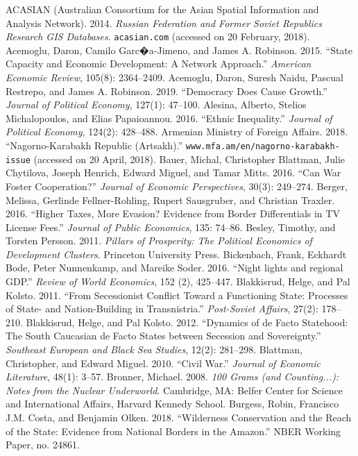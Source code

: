 \documentclass[12pt,a4paper]{article}%
\begin{document}
\begin{thebibliography}{99}
\bibitem{} ACASIAN (Australian Consortium for the Asian Spatial Information and Analysis Network). 2014. \textit{Russian Federation and Former Soviet Republics Research GIS Databases}. \verb!acasian.com! (accessed on 20 February, 2018).
\bibitem{} Acemoglu, Daron, Camilo Garc�a-Jimeno, and James A. Robinson. 2015. ``State Capacity and Economic Development: A Network Approach.'' \textit{American Economic Review}, 105(8): 2364--2409.
\bibitem{} Acemoglu, Daron, Suresh Naidu, Pascual Restrepo, and James A. Robinson. 2019. ``Democracy Does Cause Growth.'' \textit{Journal of Political Economy}, 127(1): 47--100.
\bibitem{} Alesina, Alberto, Stelios Michalopoulos, and Elias Papaioannou. 2016. ``Ethnic Inequality.'' \textit{Journal of Political Economy}, 124(2): 428--488.
\bibitem{} Armenian Ministry of Foreign Affairs. 2018. ``Nagorno-Karabakh Republic (Artsakh).'' \verb!www.mfa.am/en/nagorno-karabakh-issue! (accessed on 20 April, 2018).
\bibitem{} Bauer, Michal, Christopher Blattman, Julie Chytilova, Joseph Henrich, Edward Miguel, and Tamar Mitts. 2016. ``Can War Foster Cooperation?'' \textit{Journal of Economic Perspectives}, 30(3): 249--274.
\bibitem{} Berger, Melissa, Gerlinde Fellner-Rohling, Rupert Sausgruber, and Christian Traxler. 2016. ``Higher Taxes, More Evasion? Evidence from Border Differentials in TV License Fees.'' \textit{Journal of Public Economics}, 135: 74--86.
\bibitem{} Besley, Timothy, and Torsten Persson. 2011. \textit{Pillars of Prosperity: The Political Economics of Development Clusters}. Princeton University Press.
\bibitem{} Bickenbach, Frank, Eckhardt Bode, Peter Nunnenkamp, and Mareike Soder. 2016. ``Night lights and regional GDP.'' \textit{Review of World Economics}, 152 (2), 425--447.
\bibitem{} Blakkisrud, Helge, and Pal Kolsto. 2011. ``From Secessionist Conflict Toward a Functioning State: Processes of State- and Nation-Building in Transnistria.'' \textit{Post-Soviet Affairs}, 27(2): 178--210.
\bibitem{} Blakkisrud, Helge, and Pal Kolsto. 2012. ``Dynamics of de Facto Statehood: The South Caucasian de Facto States between Secession and Sovereignty.'' \textit{Southeast European and Black Sea Studies}, 12(2): 281--298.
\bibitem{} Blattman, Christopher, and Edward Miguel. 2010. ``Civil War.'' \textit{Journal of Economic Literature}, 48(1): 3--57.      
\bibitem{} Bronner, Michael. 2008. \textit{100 Grams (and Counting...): Notes from the Nuclear Underworld}. Cambridge, MA: Belfer Center for Science and International Affairs, Harvard Kennedy School.       
\bibitem{} Burgess, Robin, Francisco J.M. Costa, and Benjamin Olken. 2018. ``Wilderness Conservation and the Reach of the State: Evidence from National Borders in the Amazon.'' NBER Working Paper, no. 24861.                                                                      

\end{thebibliography}
\end{document}
